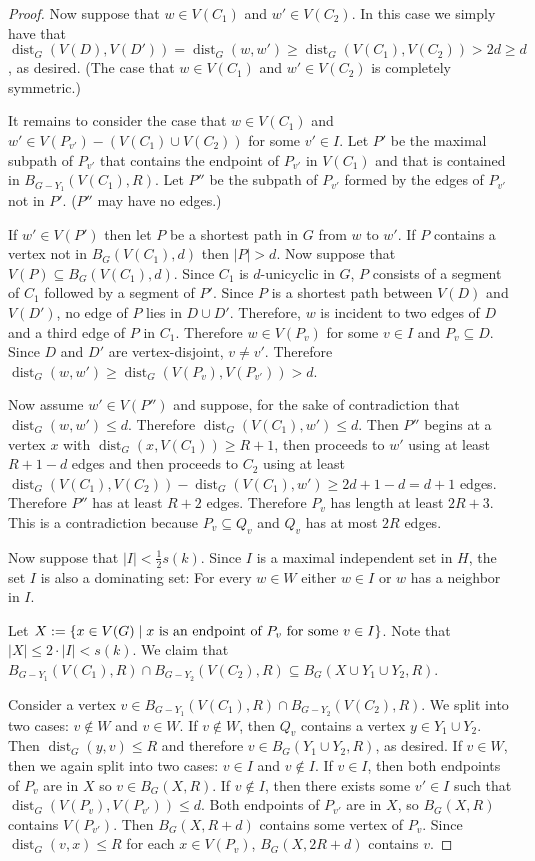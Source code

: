 \documentclass{patmorin}
\DeclareMathOperator{\dist}{dist}
\DeclarePairedDelimiter\set{\{}{\}}
\begin{document}
\begin{proof}
    Now suppose that $w\in V(C_1)$ and $w'\in V(C_2)$.
    In this case we simply have that
    $\dist_G(V(D),V(D'))=\dist_G(w,w')\geq \dist_G(V(C_1),V(C_2))>2d\geq d$, as desired.
    (The case that $w\in V(C_1)$ and $w'\in V(C_2)$ is completely symmetric.)

    It remains to consider the case that
    $w\in V(C_1)$ and $w'\in V(P_{v'})- (V(C_1)\cup V(C_2))$ for some $v'\in I$.  Let $P'$ be the maximal subpath of $P_{v'}$ that contains the endpoint of $P_{v'}$ in $V(C_1)$ and that is contained in $B_{G-Y_1}(V(C_1),R)$. Let $P''$ be the subpath of $P_{v'}$ formed by the edges of $P_{v'}$ not in $P'$.  ($P''$ may have no edges.)

    If $w'\in V(P')$ then let $P$ be a shortest path in $G$ from $w$ to $w'$.  If $P$ contains a vertex not in $B_G(V(C_1),d)$ then $|P|> d$.
    Now suppose that $V(P)\subseteq B_G(V(C_1),d)$.
    Since $C_1$ is $d$-unicyclic in $G$, $P$ consists of a segment of $C_1$ followed by a segment of $P'$.
    Since $P$ is a shortest path between $V(D)$ and $V(D')$, no edge of $P$ lies in $D\cup D'$.  Therefore, $w$ is incident to two edges of $D$ and a third edge of $P$ in $C_1$.  Therefore $w\in V(P_v)$ for some $v\in I$ and $P_v\subseteq D$.  Since $D$ and $D'$ are vertex-disjoint, $v\neq v'$.  Therefore $\dist_G(w,w')\ge\dist_G(V(P_v),V(P_{v'}))>d$.

    Now assume $w'\in V(P'')$ and suppose, for the sake of contradiction that $\dist_G(w,w')\le d$. Therefore $\dist_G(V(C_1),w')\le d$.  Then $P''$ begins at a vertex $x$ with $\dist_G(x,V(C_1))\ge R+1$, then proceeds to $w'$ using at least $R+1-d$ edges and then proceeds to $C_2$ using at least $\dist_G(V(C_1),V(C_2))-\dist_G(V(C_1),w')\ge 2d+1-d=d+1$ edges.  Therefore $P''$ has at least $R+2$ edges.  Therefore $P_v$ has length at least $2R+3$. This is a contradiction because $P_v\subseteq Q_v$ and $Q_v$ has at most $2R$ edges.

    Now suppose that $|I|<\frac{1}{2}s(k)$.
    Since $I$ is a maximal independent set in $H$, the set $I$ is also a dominating set:
    For every $w\in W$ either $w\in I$ or $w$ has a neighbor in $I$.

    Let $X:=\set{x \in V(G) \mid \textrm{$x$ is an endpoint of $P_v$ for some $v\in I$}}$. 
    Note that $|X|\leq 2\cdot|I| < s(k)$. 
    We claim that
    $B_{G-Y_1}(V(C_1),R)\cap B_{G-Y_2}(V(C_2),R)\subseteq B_G(X\cup Y_1\cup Y_2,R)$.

    Consider a vertex $v \in B_{G-Y_1}(V(C_1),R)\cap B_{G-Y_2}(V(C_2),R)$.
    We split into two cases: $v\not\in W$ and $v\in W$.
    If $v\not\in W$, then $Q_v$ contains a vertex $y \in Y_1\cup Y_2$.
    Then $\dist_G(y,v) \leq R$ and therefore
    $v\in B_G(Y_1\cup Y_2,R)$, as desired.
    If $v\in W$, then we again split into two cases: $v\in I$ and $v\notin I$.
    If $v\in I$, then both endpoints of $P_v$ are in $X$ so $v\in B_G(X,R)$.
    If $v\notin I$, then there exists some $v'\in I$ such that $\dist_G(V(P_v),V(P_{v'}))\le d$.
    Both endpoints of $P_{v'}$ are in $X$, so $B_G(X,R)$ contains $V(P_{v'})$.  Then $B_G(X,R+d)$ contains some vertex of $P_v$.  Since $\dist_G(v,x)\le R$ for each $x\in V(P_v)$, $B_G(X,2R+d)$ contains $v$.
\end{proof}
\end{document}
